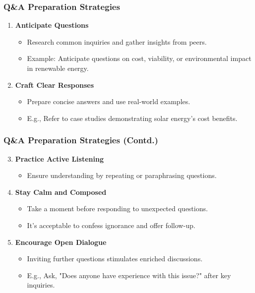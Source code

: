 \documentclass[aspectratio=169]{beamer}
\begin{document}
\begin{frame}[fragile]
    \frametitle{Q\&A Preparation Strategies}
    \begin{enumerate}
        \item \textbf{Anticipate Questions}
            \begin{itemize}
                \item Research common inquiries and gather insights from peers.
                \item Example: Anticipate questions on cost, viability, or environmental impact in renewable energy.
            \end{itemize}
        \item \textbf{Craft Clear Responses}
            \begin{itemize}
                \item Prepare concise answers and use real-world examples.
                \item E.g., Refer to case studies demonstrating solar energy's cost benefits.
            \end{itemize}
    \end{enumerate}
\end{frame}

\begin{frame}[fragile]
    \frametitle{Q\&A Preparation Strategies (Contd.)}
    \begin{enumerate}
        \setcounter{enumi}{2} %
        \item \textbf{Practice Active Listening}
            \begin{itemize}
                \item Ensure understanding by repeating or paraphrasing questions.
            \end{itemize}
        \item \textbf{Stay Calm and Composed}
            \begin{itemize}
                \item Take a moment before responding to unexpected questions.
                \item It's acceptable to confess ignorance and offer follow-up.
            \end{itemize}
        \item \textbf{Encourage Open Dialogue}
            \begin{itemize}
                \item Inviting further questions stimulates enriched discussions. 
                \item E.g., Ask, "Does anyone have experience with this issue?" after key inquiries.
            \end{itemize}
    \end{enumerate}
\end{frame}
\end{document}
